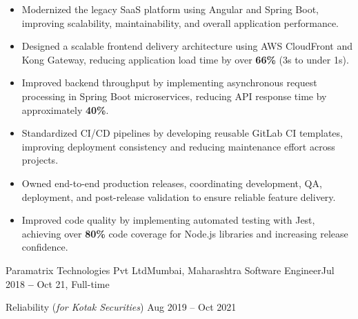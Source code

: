 \documentclass{resume}
\begin{document}
        \begin {itemize}[leftmargin=0in, label={-}]

            \item\small Modernized the legacy SaaS platform using Angular and Spring Boot, improving scalability, maintainability, and overall application performance.
            
            \item\small Designed a scalable frontend delivery architecture using AWS CloudFront and Kong Gateway, reducing application load time by over \textbf{66\%} (3s to under 1s).
            
            \item\small Improved backend throughput by implementing asynchronous request processing in Spring Boot microservices, reducing API response time by approximately \textbf{40\%}.
            
            \item\small Standardized CI/CD pipelines by developing reusable GitLab CI templates, improving deployment consistency and reducing maintenance effort across projects.
            
            \item\small Owned end-to-end production releases, coordinating development, QA, deployment, and post-release validation to ensure reliable feature delivery.
            
            \item\small Improved code quality by implementing automated testing with Jest, achieving over \textbf{80\%} code coverage for Node.js libraries and increasing release confidence.
            
            
        \end{itemize}

    
    \resumeItemListEnd
    \resumeSubHeadingListEnd
    
    \resumeSubHeadingListStart
    \firstCompanyHeading
          {Paramatrix Technologies Pvt Ltd}{Mumbai, Maharashtra}
          {Software Engineer}{Jul 2018 \textbf{--} Oct 21, Full-time}
    
    \resumeItemListStart
        \projectOneHead
        {Reliability (\normalfont \textit{for Kotak Securities})}
        {Aug 2019 -- Oct 2021}
\end{document}
